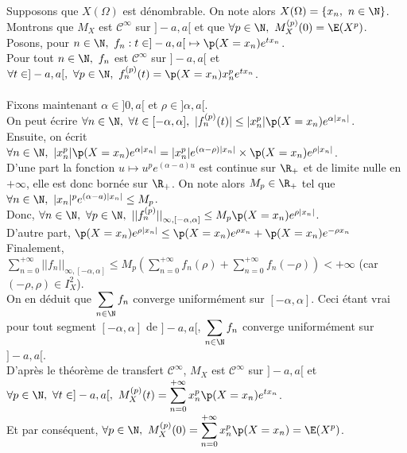 \documentclass[8pt]{book}
\begin{document}
\begin{enumerate}[leftmargin=*]
		Supposons que $X(\Omega)$ est dénombrable. On note alors $X(\Omega)=\{x_n,\ n\in\N\}$. Montrons que $M_X$ est $\mathcal{C}^\infty$ sur $]-a,a[$ et que $\forall p\in \N,\ M_X^{(p)}(0)=\E(X^p)$.\\
		Posons, pour $n\in \N,\ f_n:t\in ]-a,a[\ \mapsto \p(X=x_n)e^{tx_n}$.\\
		Pour tout $n\in \N,\ f_n$ est $\mathcal{C}^\infty$ sur $]-a,a[$ et $\forall t\in ]-a,a[,\ \forall p\in \N,\ f_n^{(p)}(t)=\p(X=x_n)x_n^pe^{tx_n}$.\\\\
		Fixons maintenant $\alpha\in ]0,a[$ et $\rho\in ]\alpha,a[$.\\
		On peut écrire $\forall n\in \N,\ \forall t\in [-\alpha,\alpha],\ |f_n^{(p)}(t)|\leq |x_n^p|\p(X=x_n)e^{\alpha|x_n|}$.\\
		Ensuite, on écrit $\forall n\in \N,\ |x_n^p|\p(X=x_n)e^{\alpha|x_n|}=|x_n^p|e^{(\alpha-\rho)|x_n|}\times \p(X=x_n)e^{\rho|x_n|}$.\\
		D'une part la fonction $u\mapsto u^pe^{(\alpha-a)u}$ est continue sur $\R_+$ et de limite nulle en $+\infty$, elle est donc bornée sur $\R_+$. On note alors $M_p\in \R_+$ tel que $\forall n\in \N,\ |x_n|^pe^{(\alpha-a)|x_n|}\leq M_p$.\\
		Donc, $\forall n\in \N,\ \forall p\in \N,\ {||f_n^{(p)}||}_{\infty,[-\alpha,\alpha]}\leq M_p\p(X=x_n)e^{\rho|x_n|}$.\\
		D'autre part, $\p(X=x_n)e^{\rho|x_n|}\leq \p(X=x_n)e^{\rho x_n}+\p(X=x_n)e^{-\rho x_n}$\\
		Finalement, $\displaystyle\sum\limits_{n=0}^{+\infty}{||f_n||}_{\infty,[-\alpha,\alpha]}\leq M_p\left(\sum\limits_{n=0}^{+\infty}f_n(\rho)+\sum\limits_{n=0}^{+\infty}f_n(-\rho)\right)<+\infty$ (car $(-\rho,\rho)\in I_X^2$).\\
		On en déduit que $\displaystyle\sum\limits_{n\in\N}f_n$ converge uniformément sur $[-\alpha,\alpha]$. Ceci étant vrai pour tout segment $[-\alpha,\alpha]$ de $]-a,a[$, $\displaystyle\sum\limits_{n\in\N}f_n$ converge uniformément sur $]-a,a[$.\\
		D'après le théorème de transfert $\mathcal{C}^\infty$, $M_X$ est $\mathcal{C}^\infty$ sur $]-a,a[$ et $\forall p\in \N,\ \forall t\in ]-a,a[,\ M_X^{(p)}(t)=\displaystyle\sum\limits_{n=0}^{+\infty}x_n^p\p(X=x_n)e^{tx_n}$.\\
		Et par conséquent, $\forall p\in \N,\ M_X^{(p)}(0)=\displaystyle\sum\limits_{n=0}^{+\infty}x_n^p\p(X=x_n)=\E(X^p)$.\\\\

\end{enumerate}
\end{document}
